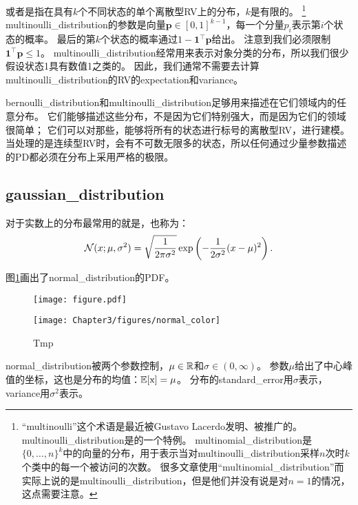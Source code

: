或者是指在具有$k$个不同状态的单个离散型\gls{RV}上的分布，$k$是有限的。
\footnote{``multinoulli''这个术语是最近被Gustavo Lacerdo发明、被\cite{MurphyBook2012}推广的。
\gls{multinoulli_distribution}是的一个特例。
\gls{multinomial_distribution}是$\{0,\ldots, n\}^k$中的向量的分布，用于表示当对\gls{multinoulli_distribution}采样$n$次时$k$个类中的每一个被访问的次数。
很多文章使用``\gls{multinomial_distribution}''而实际上说的是\gls{multinoulli_distribution}，但是他们并没有说是对$n=1$的情况，这点需要注意。}
\gls{multinoulli_distribution}的参数是向量$\bm{p} \in [0, 1]^{k-1}$，每一个分量$p_i$表示第$i$个状态的概率。
最后的第$k$个状态的概率通过$1-\bm{1}^\top \bm{p}$给出。
注意到我们必须限制$\bm{1}^\top\bm{p}\le 1$。
\gls{multinoulli_distribution}经常用来表示对象分类的分布，所以我们很少假设状态1具有数值1之类的。
因此，我们通常不需要去计算\gls{multinoulli_distribution}的\gls{RV}的\gls{expectation}和\gls{variance}。


\gls{bernoulli_distribution}和\gls{multinoulli_distribution}足够用来描述在它们领域内的任意分布。
它们能够描述这些分布，不是因为它们特别强大，而是因为它们的领域很简单；
它们可以对那些，能够将所有的状态进行标号的离散型\gls{RV}，进行建模。
当处理的是连续型\gls{RV}时，会有不可数无限多的状态，所以任何通过少量参数描述的\gls{PD}都必须在分布上采用严格的极限。

\subsection{\gls{gaussian_distribution}}
\label{sec:gaussian_distribution}


对于实数上的分布最常用的就是，也称为：
\begin{equation}
\mathcal{N}(x; \mu, \sigma^2) = \sqrt{\frac{1}{2\pi \sigma^2}} \exp \left ( -\frac{1}{2\sigma^2} (x-\mu)^2 \right ).
\end{equation}

图\ref{fig:chap3_normal_color}画出了\gls{normal_distribution}的\gls{PDF}。
\begin{figure}[!htb]
\ifOpenSource
\centerline{\texttt{[image: figure.pdf]}}
\else
\centerline{\texttt{[image: Chapter3/figures/normal\_color]}}
\fi
\caption{Tmp}
\label{fig:chap3_normal_color}
\end{figure}

\gls{normal_distribution}被两个参数控制，$\mu \in \mathbb{R}$和$\sigma \in (0, \infty)$。
参数$\mu$给出了中心峰值的坐标，这也是分布的均值：$\mathbb{E}[\mathrm{x}] = \mu$。
分布的\gls{standard_error}用$\sigma$表示，\gls{variance}用$\sigma^2$表示。

